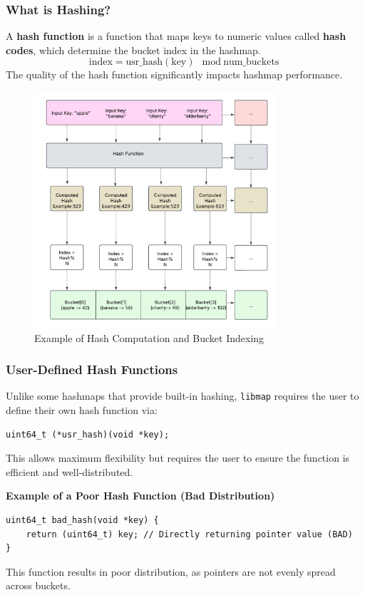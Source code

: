 \documentclass[titlepage]{article}
\begin{document}
\subsubsection{What is Hashing?}
A \textbf{hash function} is a function that maps keys to numeric values called \textbf{hash codes}, which determine the bucket index in the hashmap.
\[
\text{index} = \text{usr\_hash}(\text{key}) \mod \text{num\_buckets}
\]
The quality of the hash function significantly impacts hashmap performance.

\begin{figure}[H]
    \centering
    \includegraphics[width=0.8\textwidth]{hash_computation.pdf}
    \caption{Example of Hash Computation and Bucket Indexing}
    \label{fig:hashing}
\end{figure}



\subsubsection{User-Defined Hash Functions}
Unlike some hashmaps that provide built-in hashing, \texttt{libmap} requires the user to define their own hash function via:
\begin{verbatim}
uint64_t (*usr_hash)(void *key);
\end{verbatim}
This allows maximum flexibility but requires the user to ensure the function is efficient and well-distributed.

\textbf{Example of a Poor Hash Function (Bad Distribution)}
\begin{verbatim}
uint64_t bad_hash(void *key) {
    return (uint64_t) key; // Directly returning pointer value (BAD)
}
\end{verbatim}
This function results in poor distribution, as pointers are not evenly spread across buckets.
\end{document}
